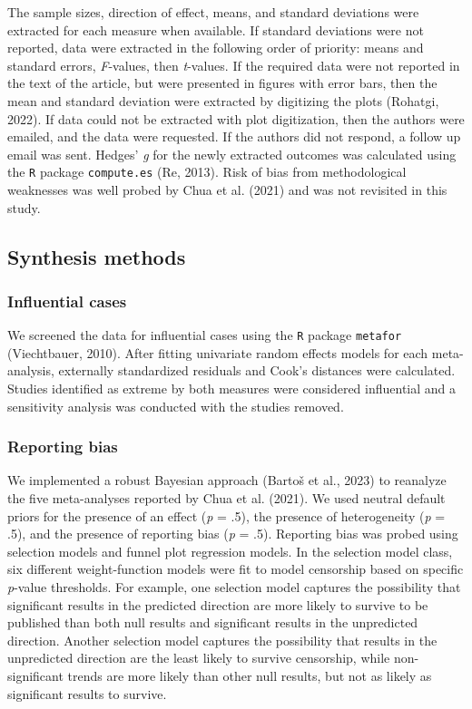 \documentclass[
  man, donotrepeattitle,floatsintext]{apa7}
\begin{document}
The sample sizes, direction of effect, means, and standard deviations were extracted for each measure when available. If standard deviations were not reported, data were extracted in the following order of priority: means and standard errors, \emph{F}-values, then \emph{t}-values. If the required data were not reported in the text of the article, but were presented in figures with error bars, then the mean and standard deviation were extracted by digitizing the plots (Rohatgi, 2022). If data could not be extracted with plot digitization, then the authors were emailed, and the data were requested. If the authors did not respond, a follow up email was sent. Hedges' \emph{g} for the newly extracted outcomes was calculated using the \texttt{R} package \texttt{compute.es} (Re, 2013). Risk of bias from methodological weaknesses was well probed by Chua et al. (2021) and was not revisited in this study.

\hypertarget{synthesis-methods}{%
\subsection{Synthesis methods}\label{synthesis-methods}}

\hypertarget{influential-cases}{%
\subsubsection{Influential cases}\label{influential-cases}}

We screened the data for influential cases using the \texttt{R} package \texttt{metafor} (Viechtbauer, 2010). After fitting univariate random effects models for each meta-analysis, externally standardized residuals and Cook's distances were calculated. Studies identified as extreme by both measures were considered influential and a sensitivity analysis was conducted with the studies removed.

\hypertarget{reporting-bias}{%
\subsubsection{Reporting bias}\label{reporting-bias}}

We implemented a robust Bayesian approach (Bartoš et al., 2023) to reanalyze the five meta-analyses reported by Chua et al. (2021). We used neutral default priors for the presence of an effect (\emph{p} = .5), the presence of heterogeneity (\emph{p} = .5), and the presence of reporting bias (\emph{p} = .5). Reporting bias was probed using selection models and funnel plot regression models. In the selection model class, six different weight-function models were fit to model censorship based on specific \emph{p}-value thresholds. For example, one selection model captures the possibility that significant results in the predicted direction are more likely to survive to be published than both null results and significant results in the unpredicted direction. Another selection model captures the possibility that results in the unpredicted direction are the least likely to survive censorship, while non-significant trends are more likely than other null results, but not as likely as significant results to survive.
\end{document}
